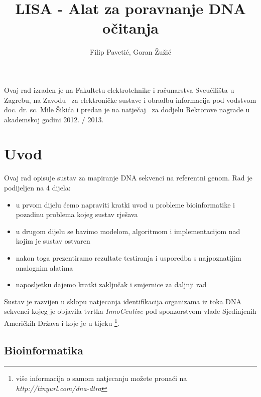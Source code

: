\documentclass[times, utf8, diplomski]{fer}
\begin{document}
\title{LISA - Alat za poravnanje DNA očitanja}

\author{Filip Paveti\'{c}, Goran \v{Z}u\v{z}i\'{c}}

\maketitle

\newcommand{\zahvalaX}[1]{%
	\newpage
 	\setcounter{page}{3}
	\vspace*{\fill}
	#1
	\vspace*{\fill}
}


\zahvalaX{Ovaj rad izrađen je na Fakultetu elektrotehnike i računarstva Sveučilišta u Zagrebu, na Zavodu \
za elektroničke sustave i obradbu informacija pod vodstvom doc. dr. sc. Mile Šikića i predan je na natječaj \
za dodjelu Rektorove nagrade u akademskoj godini 2012. / 2013.}

\tableofcontents

\chapter{Uvod}
Ovaj rad opisuje sustav za mapiranje DNA sekvenci na referentni genom. Rad je podijeljen na 4 dijela:
\begin{itemize}
\item u prvom dijelu ćemo napraviti kratki uvod u probleme bioinformatike i pozadinu problema kojeg sustav rješava
\item u drugom dijelu se bavimo modelom, algoritmom i implementacijom nad kojim je sustav ostvaren
\item nakon toga prezentiramo rezultate testiranja i usporedba s najpoznatijim analognim alatima
\item naposljetku dajemo kratki zaključak i smjernice za daljnji rad
\end{itemize}

Sustav je razvijen u sklopu natjecanja identifikacija organizama iz toka DNA sekvenci
kojeg je objavila tvrtka \emph{InnoCentive} pod sponzorstvom vlade Sjedinjenih Američkih Država
i koje je u tijeku \footnote{više informacija o samom natjecanju možete pronaći na \emph{http://tinyurl.com/dna-dtra}}.

\section{Bioinformatika}
\end{document}
